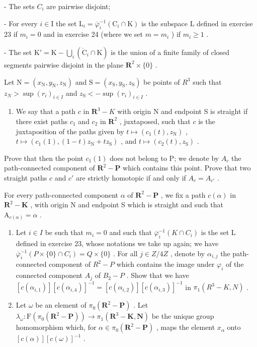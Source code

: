 - The sets \(C_{i}\) are pairwise disjoint;

 - For every \(i \in \mathrm{I}\) the set \(\mathrm{L}_i = \overline{\varphi}_i^{-1}(\mathrm{C}_i \cap \mathrm{K})\) is the subspace \(\mathrm{L}\) defined in exercise 23 if \(m_i = 0\) and in exercise 24 (where we set \(m = m_i\) ) if \(m_i \geqslant 1\) .

- The set \(\mathrm{K}' = \mathrm{K} - \bigcup_{i} (\mathring{\mathrm{C}}_i \cap \mathrm{K})\) is the union of a finite family of closed segments pairwise disjoint in the plane \(\mathbf{R}^2 \times \{0\}\) .

Let \(\mathrm{N} = (x_{\mathrm{N}}, y_{\mathrm{N}}, z_{\mathrm{N}})\) and \(\mathrm{S} = (x_{\mathrm{S}}, y_{\mathrm{S}}, z_{\mathrm{S}})\) be points of \(R^{3}\) such that \(z_{N} > \sup(r_{i})_{i \in I}\) and \(z_{\mathrm{S}} < -\sup(r_{i})_{i \in I}\) .

\begin{enumerate}
\def\labelenumi{\alph{enumi})}
\tightlist
\item
   We say that a path \(c\) in \(\mathbf{R}^3-K\) with origin N and endpoint S is straight if there exist paths \(c_1\) and \(c_2\) in \(\mathbf{R}^2\) , juxtaposed, such that \(c\) is the juxtaposition of the paths given by \(t \mapsto (c_1(t), z_{\mathrm{N}})\) , \(t \mapsto (c_1(1), (1 - t)z_{\mathrm{N}} + tz_{\mathrm{S}})\) , and \(t \mapsto (c_2(t), z_{\mathrm{S}})\) .
\end{enumerate}

Prove that then the point \(c_1(1)\) does not belong to P; we denote by \(A_c\) the path-connected component of \(\mathbf{R}^2 - \mathbf{P}\) which contains this point. Prove that two straight paths \(c\) and \(c'\) are strictly homotopic if and only if \(A_c = A_{c'}\) .

   For every path-connected component \(\alpha\) of \(\mathbf{R}^2-\mathbf{P}\) , we fix a path \(c(\alpha)\) in \(\mathbf{R}^2-\mathbf{K}\) , with origin N and endpoint S which is straight and such that \(\mathrm{A}_{c(\alpha)} = \alpha\) .

\begin{enumerate}
\def\labelenumi{\alph{enumi})}
\setcounter{enumi}{1}
\item
   Let \(i \in I\) be such that \(m_{i} = 0\) and such that \(\overline{\varphi}_{i}^{-1}(K \cap C_{i})\) is the set L defined in exercise 23, whose notations we take up again; we have \(\overline{\varphi}_{i}^{-1}(P \times \{0\} \cap C_{i}) = Q \times \{0\}\) . For all \(j \in Z/4Z\) , denote by \(\alpha_{i,j}\) the path-connected component of \(R^{2} - P\) which contains the image under \(\varphi_{i}\) of the connected component \(A_{j}\) of \(B_{2} - P\) . Show that we have \([c(\alpha_{i,1})][c(\alpha_{i,4})]^{-1} = [c(\alpha_{i,2})][c(\alpha_{i,3})]^{-1}\) in \(\pi_{1}(R^{3} - K, N)\) .
\item
   Let \(\omega\) be an element of \(\pi_0(\mathbf{R}^2-\mathbf{P})\) . Let \(\lambda_\omega\colon \mathrm{F}(\pi_0(\mathbf{R}^2-\mathbf{P}))\to \pi_1(\mathbf{R}^3-\mathbf{K},\mathbf{N})\) be the unique group homomorphism which, for \(\alpha \in \pi_0(\mathbf{R}^2-\mathbf{P})\) , maps the element \(x_\alpha\) onto \([c(\alpha)][c(\omega)]^{-1}\) .
\end{enumerate}

